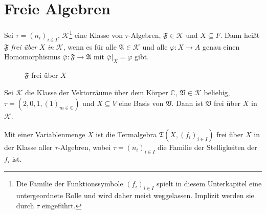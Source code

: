 \section{Freie Algebren}

\begin{definition}
Sei $ \tau = (n_i)_{i \in I}$, $\mathcal{K}$\footnote{Die Familie der Funktionssymbole $(f_i)_{i\in I}$ spielt in diesem Unterkapitel eine untergeordnete Rolle und wird daher meist weggelassen. Implizit werden sie durch $\tau$ eingeführt.} eine Klasse von $\tau$-Algebren, $\mathfrak{F} \in \mathcal{K}$ und $X \subseteq F$. Dann heißt $\mathfrak{F}$ \emph{frei über} $X$ \emph{in} $\mathcal{K}$, wenn es für alle $\mathfrak{A} \in \mathcal{K}$ und alle $\varphi : X \to A$ genau einen Homomorphismus $\overline{\varphi} : \mathfrak{F} \to \mathfrak{A}$ mit $\overline{\varphi} \vert_X = \varphi$ gibt.

\begin{figure}[H]
    \centering
    \caption{$\mathfrak{F}$ frei über $X$}
\end{figure}
\end{definition}

\begin{example}
    Sei $\mathcal{K}$ die Klasse der Vektorräume über dem Körper $\mathbb{C}$, $\mathfrak{V} \in \mathcal{K}$ beliebig, $\tau=(2,0,1,(1)_{m\in\mathbb{C}})$ und $X \subseteq V$ eine Basis von $\mathfrak{V}$. Dann ist $\mathfrak{V}$ frei über $X$ in $\mathcal{K}$.

    Mit einer Variablenmenge $X$ ist die Termalgebra $\mathfrak{T}(X, (f_i)_{i \in I})$ frei über $X$ in der Klasse aller $\tau$-Algebren, wobei $\tau=(n_i)_{i\in I}$ die Familie der Stelligkeiten der $f_i$ ist.
\end{example}

